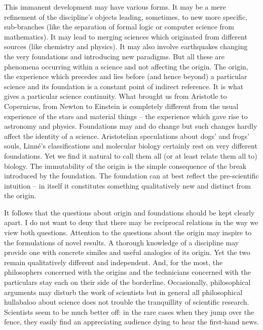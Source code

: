 This immanent development may have various forms. It may be a mere refinement 
of the discipline's objects leading, sometimes, to new more specific, 
sub-branches (like the separation of formal logic or computer science from 
mathematics). It may lead to merging sciences which originated from different 
sources (like chemistry and physics). It may also involve earthquakes changing
 the very foundations and introducing new paradigms. But all these are 
phenomena occurring within a science and not affecting the origin. The origin,
 the experience which precedes and lies before (and hence beyond) a particular
 science and its foundation is a constant point of indirect reference. It is 
what gives a particular science continuity. What brought us from Aristotle to 
Copernicus, from Newton to Einstein is completely different from the usual 
experience of the stars and material things -- the experience which gave rise 
to astronomy and physics. Foundations may and do change but such changes 
hardly affect the identity of a science. Aristotelian speculations about dogs'
 and frogs' souls, Linn\'{e}'s classifications and molecular biology certainly 
rest on very different foundations. Yet we find it natural to call them all 
(or at least relate them all to) biology. The immutability of the origin is 
the simple consequence of the break introduced by the foundation. The 
foundation can at best reflect the pre-scientific intuition -- in itself it 
constitutes something qualitatively new and distinct from the origin.

It follows that the questions about origin and foundations should be kept 
clearly apart. I do not want to deny that there may be reciprocal relations in
 the way we view both questions. Attention to the questions about the origin 
may inspire to the formulations of novel results. A thorough knowledge of a 
discipline may provide one with concrete similes and useful analogies of its 
origin. Yet the two remain qualitatively different and independent. And, for 
the most, the philosophers concerned with the origins and the technicians 
concerned with the particulars stay each on their side of the borderline. 
Occasionally, philosophical arguments may disturb the work of scientists but 
in general all philosophical hullabaloo about science does not trouble the 
tranquillity of scientific research. Scientists seem to be much better off: 
in the rare cases when they jump over the fence, they easily find an 
appreciating audience dying to hear the first-hand news.

